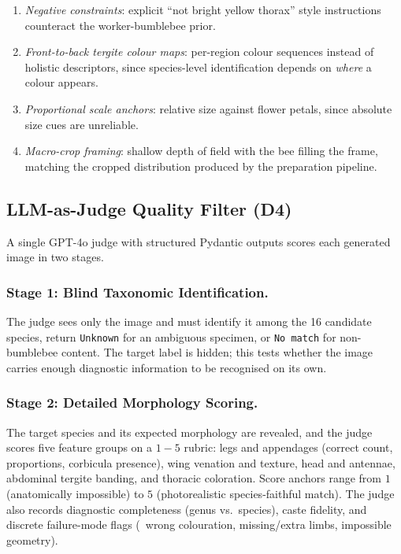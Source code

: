 \documentclass[runningheads]{llncs}
\begin{document}
\begin{enumerate}
\item \emph{Negative constraints}: explicit ``not bright yellow
thorax'' style instructions counteract the worker-bumblebee prior.
\item \emph{Front-to-back tergite colour maps}: per-region colour
sequences instead of holistic descriptors, since species-level
identification depends on \emph{where} a colour appears.
\item \emph{Proportional scale anchors}: relative size against flower
petals, since absolute size cues are unreliable.
\item \emph{Macro-crop framing}: shallow depth of field with the bee
filling the frame, matching the cropped distribution produced by the
preparation pipeline.
\end{enumerate}

\subsection{LLM-as-Judge Quality Filter (D4)}
\label{sec:llm}

A single GPT-4o judge with structured Pydantic outputs scores each
generated image in two stages.

\subsubsection{Stage 1: Blind Taxonomic Identification.}
The judge sees only the image and must identify it among the 16
candidate species, return \texttt{Unknown} for an ambiguous specimen,
or \texttt{No match} for non-bumblebee content. The target label is
hidden; this tests whether the image carries enough diagnostic
information to be recognised on its own.

\subsubsection{Stage 2: Detailed Morphology Scoring.}
The target species and its expected morphology are revealed, and the
judge scores five feature groups on a $1{-}5$ rubric: legs and
appendages (correct count, proportions, corbicula presence), wing
venation and texture, head and antennae, abdominal tergite banding, and
thoracic coloration. Score anchors range from $1$ (anatomically
impossible) to $5$ (photorealistic species-faithful match). The judge
also records diagnostic completeness (genus vs.\ species), caste
fidelity, and discrete failure-mode flags (\eg~wrong colouration,
missing/extra limbs, impossible geometry).
\end{document}
